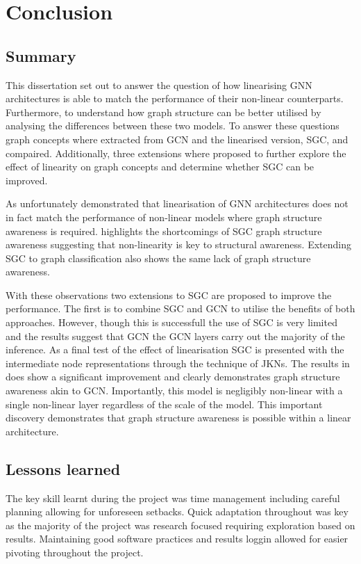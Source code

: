 \chapter{Conclusion}

\section{Summary}
This dissertation set out to answer the question of how linearising GNN architectures is able to match the performance of their non-linear counterparts.
Furthermore, to understand how graph structure can be better utilised by analysing the differences between these two models.
To answer these questions graph concepts where extracted from GCN and the linearised version, SGC, and compaired.
Additionally, three extensions where proposed to further explore the effect of linearity on graph concepts and determine whether SGC can be improved.

As  unfortunately demonstrated that linearisation of GNN architectures does not in fact match the performance of non-linear models where graph structure awareness is required.
 highlights the shortcomings of SGC graph structure awareness suggesting that non-linearity is key to structural awareness.
Extending SGC to graph classification also shows the same lack of graph structure awareness.

With these observations two extensions to SGC are proposed to improve the performance.
The first is to combine SGC and GCN to utilise the benefits of both approaches.
However, though this is successfull the use of SGC is very limited and the results suggest that GCN the GCN layers carry out the majority of the inference.
As a final test of the effect of linearisation SGC is presented with the intermediate node representations through the technique of JKNs\cite{xu2018representation}.
The results in  does show a significant improvement and clearly demonstrates graph structure awareness akin to GCN.
Importantly, this model is negligibly non-linear with a single non-linear layer regardless of the scale of the model.
This important discovery demonstrates that graph structure awareness is possible within a linear architecture.

\section{Lessons learned}
The key skill learnt during the project was time management including careful planning allowing for unforeseen setbacks.
Quick adaptation throughout was key as the majority of the project was research focused requiring exploration based on results.
Maintaining good software practices and results loggin allowed for easier pivoting throughout the project.

